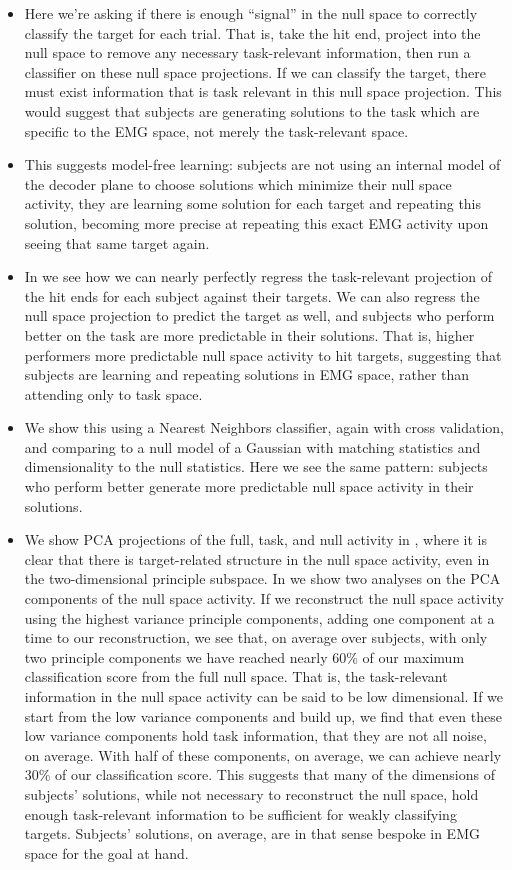 \documentclass[../main.tex]{subfiles}
\begin{document}
\begin{itemize}
  \setlength\itemsep{0em}
  \item Here we're asking if there is enough ``signal'' in the null space to correctly classify the target for each trial. That is, take the hit end, project into the null space to remove any necessary task-relevant information, then run a classifier on these null space projections. If we can classify the target, there must exist information that is task relevant in this null space projection. This would suggest that subjects are generating solutions to the task which are specific to the EMG space, not merely the task-relevant space.
  \item This suggests model-free learning: subjects are not using an internal model of the decoder plane to choose solutions which minimize their null space activity, they are learning some solution for each target and repeating this solution, becoming more precise at repeating this exact EMG activity upon seeing that same target again.
  \item In  we see how we can nearly perfectly regress the task-relevant projection of the hit ends for each subject against their targets. We can also regress the null space projection to predict the target as well, and subjects who perform better on the task are more predictable in their solutions. That is, higher performers more predictable null space activity to hit targets, suggesting that subjects are learning and repeating solutions in EMG space, rather than attending only to task space.
  \item We show this using a Nearest Neighbors classifier, again with cross validation, and comparing to a null model of a Gaussian with matching statistics and dimensionality to the null statistics. Here we see the same pattern: subjects who perform better generate more predictable null space activity in their solutions.
  \item We show PCA projections of the full, task, and null activity in , where it is clear that there is target-related structure in the null space activity, even in the two-dimensional principle subspace. In  we show two analyses on the PCA components of the null space activity. If we reconstruct the null space activity using the highest variance principle components, adding one component at a time to our reconstruction, we see that, on average over subjects, with only two principle components we have reached nearly 60\% of our maximum classification score from the full null space. That is, the task-relevant information in the null space activity can be said to be low dimensional. If we start from the low variance components and build up, we find that even these low variance components hold task information, that they are not all noise, on average. With half of these components, on average, we can achieve nearly 30\% of our classification score. This suggests that many of the dimensions of subjects' solutions, while not necessary to reconstruct the null space, hold enough task-relevant information to be sufficient for weakly classifying targets. Subjects' solutions, on average, are in that sense bespoke in EMG space for the goal at hand.

\end{itemize}
\end{document}
